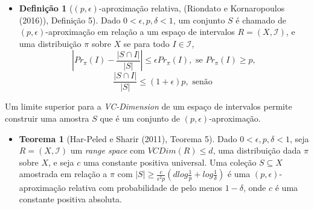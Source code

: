 \begin{itemize}
    \item \textbf{Definição 1} ($(p,\epsilon)$-aproximação relativa, (Riondato e Kornaropoulos (2016)), Definição 5). Dado $0 < \epsilon , p , \delta < 1$, um conjunto $S$ é chamado de $(p, \epsilon)$-aproximação em relação a um espaço de intervalos $R = (X, \mathcal{I})$, e uma distribuição $\pi$ sobre $X$ se para todo $I \in \mathcal{I}$, \begin{equation}
        |Pr_\pi(I)- \frac{|S \cap I|}{|S|}| \leq \epsilon Pr_\pi(I), \text{ se } Pr_\pi(I) \geq p ,
    \end{equation}\begin{equation}
        \frac{|S \cap I|}{|S|} \leq (1 + \epsilon)p, \text{ senão }
    \end{equation}
\end{itemize}

Um limite superior para a \textit{VC-Dimension} de um espaço de intervalos permite construir uma amostra $S$ que é um conjunto de $(p, \epsilon)$-aproximação.

\begin{itemize}
    \item \textbf{Teorema 1} (Har-Peled e Sharir (2011), Teorema 5). Dado $0 < \epsilon , p, \delta < 1$, seja $R = (X, \mathcal{I})$ um \textit{range space} com $VCDim(R) \leq d$, uma distribuição dada $\pi$ sobre $X$, e seja $c$ uma constante positiva universal. Uma coleção $S \subseteq X$ amostrada em relação a $\pi$ com $|S| \geq \frac{c}{\epsilon^2 p}(dlog\frac{1}{p}+log\frac{1}{\delta})$ é uma $(p, \epsilon)$-aproximação relativa com probabilidade de pelo menos $1 - \delta$, onde $c$ é uma constante positiva absoluta.
\end{itemize}